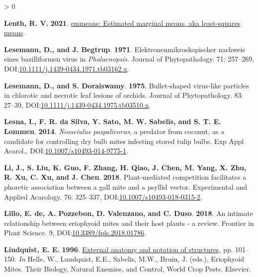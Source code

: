 \documentclass{ufdissertation}[overrideChapters] %
\newlength{\cslhangindent}
\newenvironment{CSLReferences}[2] %
 {%
  \setlength{\parindent}{0pt}
  \ifodd #1 \everypar{\setlength{\hangindent}{\cslhangindent}}\ignorespaces\fi
  \ifnum #2 > 0
  \setlength{\parskip}{#2\baselineskip}
  \fi
 }%
 {}
\begin{document}
{\begin{CSLReferences}{1}{1}
\leavevmode{}%
\textbf{Lenth, R. V.} \textbf{2021}. \href{https://CRAN.R-project.org/package=emmeans}{{emmeans}: Estimated marginal means, aka least-squares means}.

\leavevmode{}%
\textbf{Lesemann, D., and J. Begtrup}. \textbf{1971}. Elektronenmikroskopischer nachweis eines bazilliformen virus in {\emph{Phalaenopsis}}. Journal of Phytopathology. 71: 257--269, DOI:\href{https://doi.org/10.1111/j.1439-0434.1971.tb03162.x}{10.1111/j.1439-0434.1971.tb03162.x}.

\leavevmode{}%
\textbf{Lesemann, D., and S. Doraiswamy}. \textbf{1975}. Bullet-shaped virus-like particles in chlorotic and necrotic leaf lesions of orchids. Journal of Phytopathology. 83: 27--39, DOI:\href{https://doi.org/10.1111/j.1439-0434.1975.tb03510.x}{10.1111/j.1439-0434.1975.tb03510.x}.

\leavevmode{}%
\textbf{Lesna, I., F. R. da Silva, Y. Sato, M. W. Sabelis, and S. T. E. Lommen}. \textbf{2014}. {\emph{Neoseiulus paspalivorus}}, a predator from coconut, as a candidate for controlling dry bulb mites infesting stored tulip bulbs. Exp Appl Acarol., DOI:\href{https://doi.org/10.1007/s10493-014-9775-1}{10.1007/s10493-014-9775-1}.

\leavevmode{}%
\textbf{Li, J., S. Liu, K. Guo, F. Zhang, H. Qiao, J. Chen, M. Yang, X. Zhu, R. Xu, C. Xu, and J. Chen}. \textbf{2018}. Plant-mediated competition facilitates a phoretic association between a gall mite and a psyllid vector. Experimental and Applied Acarology. 76: 325--337, DOI:\href{https://doi.org/10.1007/s10493-018-0315-2}{10.1007/s10493-018-0315-2}.

\leavevmode{}%
\textbf{Lillo, E. de, A. Pozzebon, D. Valenzano, and C. Duso}. \textbf{2018}. An intimate relationship between eriophyoid mites and their host plants - a review. Frontier in Plant Science. 9, DOI:\href{https://doi.org/10.3389/fpls.2018.01786}{10.3389/fpls.2018.01786}.

\leavevmode{}%
\textbf{Lindquist, E. E.} \textbf{1996}. \href{https://doi.org/10.1016/s1572-4379(96)80006-6}{External anatomy and notation of structures}, pp. 101--150. \emph{In} Helle, W., Lundquist, E.E., Sabelis, M.W., Bruin, J. (eds.), Eriophyoid Mites. Their Biology, Natural Enemies, and Control, World Crop Pests. Elsevier.


\end{CSLReferences}}
\end{document}
